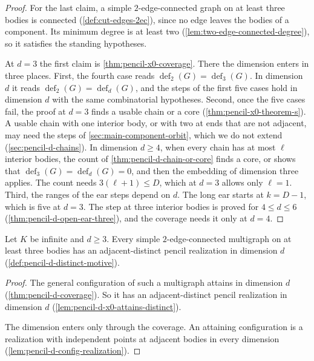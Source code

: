\begin{proof}
  For the last claim, a simple $2$-edge-connected graph on at least
  three bodies is connected (\cref{def:cut-edges-2ec}), since no edge
  leaves the bodies of a component. Its minimum degree is at least two
  (\cref{lem:two-edge-connected-degree}), so it satisfies the standing
  hypotheses.

  At $d = 3$ the first claim is \cref{thm:pencil-x0-coverage}. There the
  dimension enters in three places. First, the fourth case reads
  $\operatorname{def}_2(G) = \operatorname{def}_3(G)$. In dimension $d$
  it reads $\operatorname{def}_2(G) = \operatorname{def}_d(G)$, and the
  steps of the first five cases hold in dimension $d$ with the same
  combinatorial hypotheses. Second, once the five cases fail, the proof
  at $d = 3$ finds a usable chain or a core
  (\cref{thm:pencil-x0-theorem-s}). A usable chain with one interior
  body, or with two at ends that are not adjacent, may need the steps of
  \cref{sec:main-component-orbit}, which we do not extend
  (\cref{sec:pencil-d-chains}). In dimension $d \ge 4$, when every chain
  has at most $\ell$ interior bodies, the count of
  \cref{thm:pencil-d-chain-or-core} finds a core, or shows that
  $\operatorname{def}_3(G) = \operatorname{def}_d(G) = 0$, and then the
  embedding of dimension three applies. The count needs
  $3(\ell + 1) \le D$, which at $d = 3$ allows only $\ell = 1$. Third,
  the ranges of the ear steps
  depend on $d$. The long ear starts at $k = D - 1$, which is five at
  $d = 3$. The step at three interior bodies is proved for
  $4 \le d \le 6$ (\cref{thm:pencil-d-open-ear-three}), and the coverage
  needs it only at $d = 4$.
\end{proof}

\begin{lemma}
  \label{lem:pencil-d-distinct-statement}
  \leanok
  Let $K$ be infinite and $d \ge 3$. Every simple $2$-edge-connected
  multigraph on at least three bodies has an adjacent-distinct pencil
  realization in dimension $d$ (\cref{def:pencil-d-distinct-motive}).
\end{lemma}
\begin{proof}
  \leanok
  The general configuration of such a multigraph attains in dimension
  $d$ (\cref{thm:pencil-d-coverage}). So it has an adjacent-distinct
  pencil realization in dimension $d$
  (\cref{lem:pencil-d-x0-attains-distinct}).

  The dimension enters only through the coverage. An attaining
  configuration is a realization with independent points at adjacent
  bodies in every dimension
  (\cref{lem:pencil-d-config-realization}).
\end{proof}


